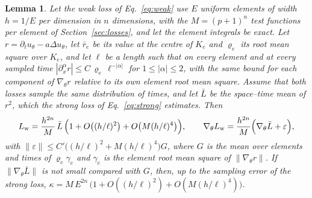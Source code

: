 \documentclass[a4paper,fleqn]{cas-sc}
\newtheorem{lemma}{Lemma}
\begin{document}
\begin{lemma}
\label{lem:kappa}
Let the weak loss of Eq.~\eqref{eq:weak} use $E$ uniform elements of width $h=1/E$ per dimension in $n$ dimensions, with
the $M=(p+1)^n$ test functions per element of Section~\ref{sec:losses}, and let the element integrals be exact. Let
$r=\partial_t u_\theta-a\Delta u_\theta$, let $\bar r_e$ be its value at the centre of $K_e$ and $\varrho_e$ its root mean
square over $K_e$, and let $\ell$ be a length such that on every element and at every sampled time
$|\partial_x^{\alpha}r|\le C\,\varrho_e\,\ell^{-|\alpha|}$ for $1\le|\alpha|\le2$, with the same bound for each component of
$\nabla_\theta r$ relative to its own element root mean square. Assume that both losses sample the same distribution of
times, and let $\bar L$ be the space--time mean of $r^2$, which the strong loss of Eq.~\eqref{eq:strong} estimates. Then
\begin{equation}
L_{\mathrm{w}} = \frac{h^{2n}}{M}\,\bar L\,\Bigl(1+O\bigl((h/\ell)^2\bigr)+O\bigl(M(h/\ell)^4\bigr)\Bigr), \qquad
\nabla_\theta L_{\mathrm{w}} = \frac{h^{2n}}{M}\Bigl(\nabla_\theta\bar L+\varepsilon\Bigr),
\label{eq:lemma}
\end{equation}
with $\|\varepsilon\|\le C'\bigl((h/\ell)^2+M(h/\ell)^4\bigr)G$, where $G$ is the mean over elements and times of
$\varrho_e\gamma_e$ and $\gamma_e$ is the element root mean square of $\|\nabla_\theta r\|$. If $\|\nabla_\theta\bar L\|$ is
not small compared with $G$, then, up to the sampling error of the strong loss,
$\kappa = M\,E^{2n}\,\bigl(1+O((h/\ell)^2)+O(M(h/\ell)^4)\bigr)$.
\end{lemma}
\end{document}
